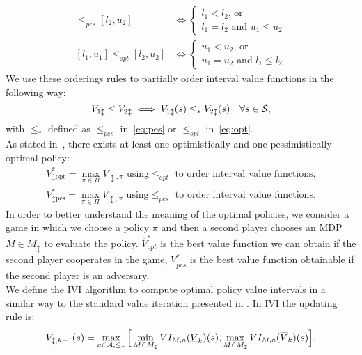 \begin{align}
[l_1, u_1] \leq_{pes} [l_2, u_2] &\Leftrightarrow 
\begin{cases}
l_1 < l_2 \text{, or }\\
l_1 = l_2 \text{ and } u_1 \leq u_2
\end{cases} \label{eq:pes}\\
[l_1, u_1] \leq_{opt} [l_2, u_2] &\Leftrightarrow 
\begin{cases}
u_1 < u_2 \text{, or }\\
u_1 = u_2 \text{ and } l_1 \leq l_2
\end{cases} \label{eq:opt}
\end{align}
We use these orderings rules to partially order interval value functions in the following way:
$$V_{1 \updownarrow} \leq V_{2 \updownarrow} \iff V_{1 \updownarrow}(s) \leq_{*} V_{2 \updownarrow}(s) \quad \forall s \in \mathcal{S},$$
with $\leq_{*}$ defined as $\leq_{pes}$ in~\eqref{eq:pes} or $\leq_{opt}$ in~\eqref{eq:opt}.\\
\newline
As stated in~\citep{givan2000bounded}, there exists at least one optimistically and one pessimistically optimal policy:
\begin{align*}
V^{*}_{\updownarrow \text{opt}} = \max_{\pi \in \Pi} V_{\updownarrow, \pi} \text{ using} \leq_{opt} \text{ to order interval value functions,}\\
V^{*}_{\updownarrow \text{pes}} = \max_{\pi \in \Pi} V_{\updownarrow, \pi} \text{ using} \leq_{pes} \text{ to order interval value functions.}
\end{align*}
In order to better understand the meaning of the optimal policies, we consider a game in which we choose a policy $\pi$ and then a second player chooses an \ac{MDP} $M \in M_{\updownarrow}$ to evaluate the policy. $\overline{V}^{*}_{opt}$ is the best value function we can obtain if the second player cooperates in the game, $\underline{V}^{*}_{pes}$ is the best value function obtainable if the second player is an adversary.\\
\newline
We define the \acf{IVI} algorithm to compute optimal policy value intervals in a similar way to the standard value iteration presented in . In \ac{IVI} the updating rule is:
\begin{align}
V_{\updownarrow, k+1}(s) = \max_{a \in \mathcal{A}, \leq_{*}} \Big[ \min_{M \in M_{\updownarrow}} VI_{M, a}(\underline{V}_{k})(s), \max_{M \in M_{\updownarrow}} VI_{M, a}(\overline{V}_{k})(s) \Big]. \label{eq:ivi}
\end{align}
